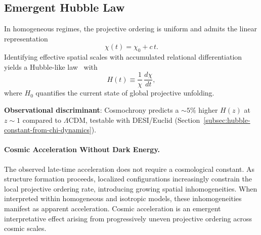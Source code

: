 \subsection{Emergent Hubble Law}
  \label{subsec:emergent-hubble-law}

  In homogeneous regimes, the projective ordering is uniform and admits the
  linear representation
  \begin{equation}
    \chi(t) = \chi_0 + c\, t .
  \end{equation}
  Identifying effective spatial scales with accumulated relational
  differentiation yields a Hubble-like
  law~\cite{Hubble1929,Hogg1999} with
  \begin{equation}
    H(t) \equiv \frac{1}{\chi}\,\frac{d\chi}{dt},
    \label{eq:hubble-like}
  \end{equation}
  where $H_0$ quantifies the current state of global projective unfolding.

  \textbf{Observational discriminant}: Cosmochrony predicts a $\sim 5\%$
  higher $H(z)$ at $z\sim 1$ compared to $\Lambda$CDM, testable with
  DESI/Euclid
  (Section~\ref{subsec:hubble-constant-from-chi-dynamics}).

  \paragraph{Cosmic Acceleration Without Dark Energy.}
    \label{par:acceleration-without-dark-energy}
    The observed late-time acceleration does not require a cosmological
    constant.
    As structure formation proceeds, localized configurations increasingly
    constrain the local projective ordering rate, introducing growing spatial
    inhomogeneities.
    When interpreted within homogeneous and isotropic models, these
    inhomogeneities manifest as apparent acceleration.
    Cosmic acceleration is an emergent interpretative effect arising from
    progressively uneven projective ordering across cosmic scales.
